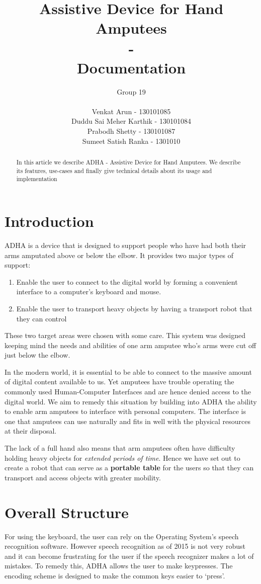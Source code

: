 \documentclass[12pt]{article}
\title{Assistive Device for Hand Amputees\\
-\\
Documentation}
\date{}
\author{Group 19\\
\\
Venkat Arun - 130101085\\
Duddu Sai Meher Karthik - 130101084\\
Prabodh Shetty - 130101087\\
Sumeet Satish Ranka - 1301010}
\begin{document}
\maketitle
\begin{abstract}
In this article we describe ADHA - Assistive Device for Hand Amputees. We describe its features, use-cases and finally give technical details about its usage and implementation
\end{abstract}

\section{Introduction}
ADHA is a device that is designed to support people who have had both their arms amputated above or below the elbow. It provides two major types of support:
\begin{enumerate}
  \item Enable the user to connect to the digital world by forming a convenient interface to a computer's keyboard and mouse.
  \item Enable the user to transport heavy objects by having a transport robot that they can control
\end{enumerate}

These two target areas were chosen with some care. This system was designed keeping mind the needs and abilities of one arm amputee who's arms were cut off just below the elbow.

In the modern world, it is essential to be able to connect to the massive amount of digital content available to us. Yet amputees have trouble operating the commonly used Human-Computer Interfaces and are hence denied access to the digital world. We aim to remedy this situation by building into ADHA the ability to enable arm amputees to interface with personal computers. The interface is one that amputees can use naturally and fits in well with the physical resources at their disposal.

The lack of a full hand also means that arm amputees often have difficulty holding heavy objects for {\it extended periods of time}. Hence we have set out to create a robot that can serve as a \textbf{portable table} for the users so that they can transport and access objects with greater mobility.

\section{Overall Structure}
For using the keyboard, the user can rely on the Operating System's speech recognition software. However speech recognition as of 2015 is not very robust and it can become frustrating for the user if the speech recognizer makes a lot of mistakes. To remedy this, ADHA allows the user to make keypresses. The encoding scheme is designed to make the common keys easier to `press'.
\end{document}
